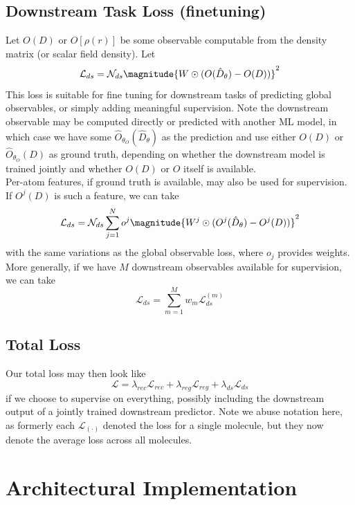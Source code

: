 \documentclass[12pt]{article}
\begin{document}
    \subsection{Downstream Task Loss (finetuning)}
    Let $O(D)$ or $O[\rho(r)]$ be some observable computable from the density matrix (or scalar field density). Let
    \begin{equation}
        \mathcal{L}_{ds} = \mathcal{N}_{ds} \magnitude{W \odot (O(\hat D_\theta) - O(D))}^2
    \end{equation}
    This loss is suitable for fine tuning for downstream tasks of predicting global observables, or simply adding meaningful supervision. Note the downstream observable may be computed directly or predicted with another ML model, in which case we have some $\hat O_{\theta_O}(\hat D_{\theta})$ as the prediction and use either $O(D)$ or $\hat O_{\theta_O}(D)$ as ground truth, depending on whether the downstream model is trained jointly and whether $O(D)$ or $O$ itself is available. \\[-6pt]

    Per-atom features, if ground truth is available, may also be used for supervision. If $O^j(D)$ is such a feature, we can take
    \[ \mathcal{L}_{ds} = \mathcal{N}_{ds} \sum _{j=1}^N o^j\magnitude{W^j \odot (O^j(\hat D_\theta) - O^j(D))}^2 \]
    with the same variations as the global observable loss, where $o_j$ provides weights. More generally, if we have $M$ downstream observables available for supervision, we can take
    \begin{equation}
        \mathcal{L}_{ds} = \sum_{m=1}^M w_m \mathcal{L}_{ds}^{(m)}
    \end{equation}

    \subsection{Total Loss}
    Our total loss may then look like
    \begin{equation}
        \mathcal{L} = \lambda_{rec} \mathcal{L}_{rec} + \lambda_{reg} \mathcal{L}_{reg} + \mathcal{\lambda}_{ds} \mathcal{L}_{ds}
    \end{equation}
    if we choose to supervise on everything, possibly including the downstream output of a jointly trained downstream predictor. Note we abuse notation here, as formerly each $\mathcal{L}_{(\cdot)}$ denoted the loss for a single molecule, but they now denote the average loss across all molecules. 

    \section{Architectural Implementation}
\end{document}
